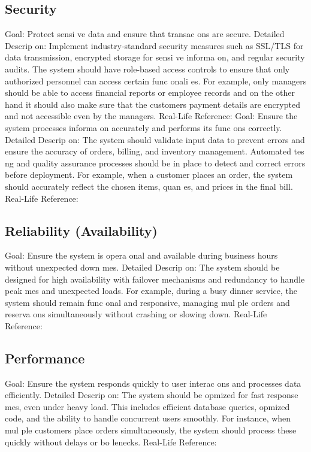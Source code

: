 \documentclass{article}
\begin{document}
\subsection{Security}
Goal: Protect sensi ve data and ensure that transac ons are secure. 
Detailed Descrip on: Implement industry-standard security measures such as SSL/TLS for 
data transmission, encrypted storage for sensi ve informa on, and regular security audits. 
The system should have role-based access controls to ensure that only authorized personnel 
can access certain func onali es. For example, only managers should be able to access 
financial reports or employee records and on the other hand it should also make sure that 
the customers payment details are encrypted and not accessible even by the managers. 
Real-Life Reference: 
Goal: Ensure the system processes informa on accurately and performs its func ons 
correctly. 
Detailed Descrip on: The system should validate input data to prevent errors and ensure 
the accuracy of orders, billing, and inventory management. Automated tes ng and quality 
assurance processes should be in place to detect and correct errors before deployment. For 
example, when a customer places an order, the system should accurately reflect the chosen 
items, quan es, and prices in the final bill. 
Real-Life Reference:  
\subsection{Reliability (Availability)} 
Goal: Ensure the system is opera onal and available during business hours without 
unexpected down mes. 
Detailed Descrip on: The system should be designed for high availability with failover 
mechanisms and redundancy to handle peak mes and unexpected loads. For example, 
during a busy dinner service, the system should remain func onal and responsive, managing 
mul ple orders and reserva ons simultaneously without crashing or slowing down. 
Real-Life Reference:  
\subsection{Performance}
Goal: Ensure the system responds quickly to user interac ons and processes data efficiently. 
Detailed Descrip on: The system should be opmized for fast response mes, even under 
heavy load. This includes efficient database queries, opmized code, and the ability to 
handle concurrent users smoothly. For instance, when mul ple customers place orders 
simultaneously, the system should process these quickly without delays or bo lenecks. 
Real-Life Reference:  
\end{document}
